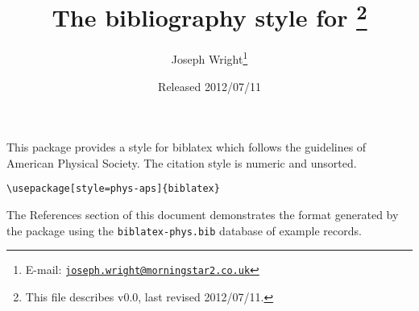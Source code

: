\documentclass[a4paper]{ltxdoc}
\author{Joseph Wright\thanks{E-mail: 
  \href{mailto:joseph.wright@morningstar2.co.uk}
  {\texttt{joseph.wright@morningstar2.co.uk}}}}
\title{The \pkg{phys-aps} bibliography style for \pkg{biblatex}%
  \footnote{This file describes v0.0, last revised 2012/07/11.}}
\date{Released 2012/07/11}
\providecommand*{\pkg}[1]{\textsf{#1}}
\begin{document}
\maketitle

This package provides a style for \pkg{biblatex} which follows the
guidelines of American Physical Society. The citation style is numeric
and unsorted.
\begin{verbatim}
\usepackage[style=phys-aps]{biblatex}
\end{verbatim}
The References section of this document demonstrates the format 
generated by the package using the \texttt{biblatex-phys.bib} database
of example records.

\nocite{*}

\printbibliography
\end{document}
